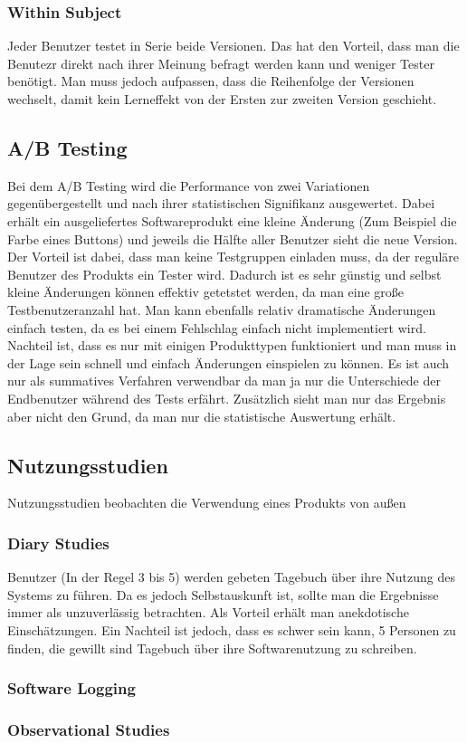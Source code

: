 \documentclass{article}
\begin{document}
	\subsubsection{Within Subject}
	Jeder Benutzer testet in Serie beide Versionen. Das hat den Vorteil, dass man die Benutezr direkt nach ihrer Meinung befragt werden kann und weniger Tester benötigt. Man muss jedoch aufpassen, dass die Reihenfolge der Versionen wechselt, damit kein Lerneffekt von der Ersten zur zweiten Version geschieht.
	\subsection{A/B Testing}
	Bei dem A/B Testing wird die Performance von zwei Variationen gegenübergestellt und nach ihrer statistischen Signifikanz ausgewertet. Dabei erhält ein ausgeliefertes Softwareprodukt eine kleine Änderung (Zum Beispiel die Farbe eines Buttons) und jeweils die Hälfte aller Benutzer sieht die neue Version. Der Vorteil ist dabei, dass man keine Testgruppen einladen muss, da der reguläre Benutzer des Produkts ein Tester wird. Dadurch ist es sehr günstig und selbst kleine Änderungen können effektiv getetstet werden, da man eine große Testbenutzeranzahl hat. Man kann ebenfalls relativ dramatische Änderungen einfach testen, da es bei einem Fehlschlag einfach nicht implementiert wird. Nachteil ist, dass es nur mit einigen Produkttypen funktioniert und man muss in der Lage sein schnell und einfach Änderungen einspielen zu können. Es ist auch nur als summatives Verfahren verwendbar da man ja nur die Unterschiede der Endbenutzer während des Tests erfährt. Zusätzlich sieht man nur das Ergebnis aber nicht den Grund, da man nur die statistische Auswertung erhält.
	\subsection{Nutzungsstudien}
	Nutzungsstudien beobachten die Verwendung eines Produkts von außen
	\subsubsection{Diary Studies}
	Benutzer (In der Regel 3 bis 5) werden gebeten Tagebuch über ihre Nutzung des Systems zu führen. Da es jedoch Selbstauskunft ist, sollte man die Ergebnisse immer als unzuverlässig betrachten. Als Vorteil erhält man anekdotische Einschätzungen. Ein Nachteil ist jedoch, dass es schwer sein kann, 5 Personen zu finden, die gewillt sind Tagebuch über ihre Softwarenutzung zu schreiben.
	\subsubsection{Software Logging}
	\subsubsection{Observational Studies}


















  
\end{document}
